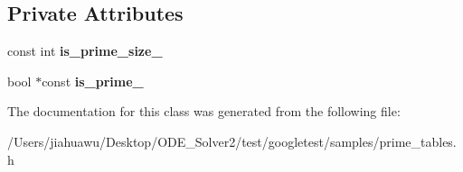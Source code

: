 \subsection*{Private Attributes}
\begin{DoxyCompactItemize}
\item 
\mbox{\label{class_pre_calculated_prime_table_ad4275df41c5e5be3cad8c5abeaad1ac6}} 
const int {\bfseries is\+\_\+prime\+\_\+size\+\_\+}
\item 
\mbox{\label{class_pre_calculated_prime_table_ac393ebf41a32b3cba39fe67f7aa5fa38}} 
bool $\ast$const {\bfseries is\+\_\+prime\+\_\+}
\end{DoxyCompactItemize}


The documentation for this class was generated from the following file\+:\begin{DoxyCompactItemize}
\item 
/\+Users/jiahuawu/\+Desktop/\+O\+D\+E\+\_\+\+Solver2/test/googletest/samples/prime\+\_\+tables.\+h\end{DoxyCompactItemize}

